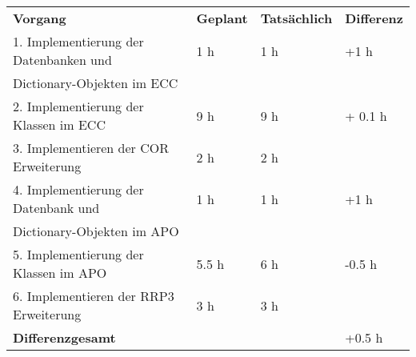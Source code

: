 \begin{tabu}{llll}
\rowfont{\bfseries\leavevmode\color{headingfont}}\textbf{Vorgang} & \textbf{Geplant} & \textbf{Tatsächlich} & \textbf{Differenz} \\
1. Implementierung der Datenbanken und & 1 h & 1 h & +1 h\\ 
Dictionary-Objekten im ECC & & & \\
2. Implementierung der Klassen im ECC & 9 h & 9 h & + 0.1 h \\
3.  Implementieren der COR Erweiterung & 2 h & 2 h & \\
4. Implementierung der Datenbank und & 1 h & 1 h & +1 h \\ 
Dictionary-Objekten im APO & & & \\
5. Implementierung der Klassen im APO & 5.5 h & 6 h & -0.5 h \\
6.  Implementieren der RRP3 Erweiterung & 3 h & 3 h & \\
\hline
\hline
{}\textbf{Differenzgesamt} & & & +0.5 h \\
\end{tabu}